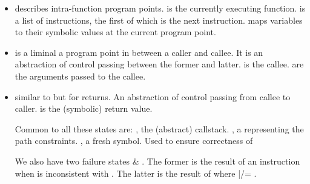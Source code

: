 \documentclass[12pt]{report}
\begin{document}
\begin{itemize}
\item  {}      
        describes intra-function program points.
         is the currently executing function.
         is a list of instructions, the first of which
        is the next instruction.
         maps variables to their symbolic values at the
        current program point.

\item  {}     
        is a liminal a program point in between a caller and
        callee. It is an abstraction of control passing
        between the former and latter.
         is the callee.
         are the arguments passed to the callee.

\item  {}    
        similar to  but for returns. An
        abstraction of control passing from callee
        to caller.
         is the (symbolic) return value.


        Common to all these states are:
        , the (abstract) callstack.
        , a   representing the path constraints.
        , a fresh symbol. Used to ensure correctness of


        We also have two failure states 
        \& . The former is the result of an
          instruction when  is inconsistent
        with . The latter is the result of  
        where  |/= .

\end{itemize}
\end{document}
